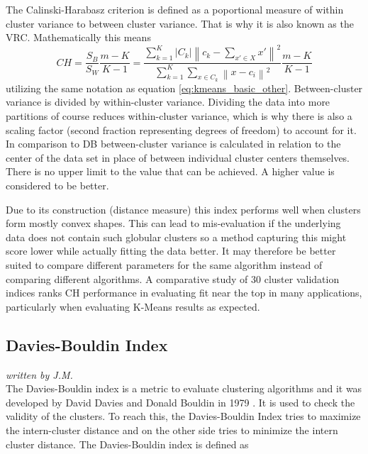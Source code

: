 The Calinski-Harabasz criterion \cite{calinski1974dendrite} is defined as a poportional measure of within cluster variance to between cluster variance. That is why it is also known as the \gls{VRC}. Mathematically this means
\begin{equation}
        CH = \frac{S_{B}}{S_{W}}\frac{m-K}{K-1} = \frac{\sum_{k=1}^{K} \left | C_{k} \right | \left \| c_{k} - \sum_{x' \in X}^{} x' \right \|^{2}}{\sum_{k=1}^{K}\sum_{x \in C_{k}}^{} \left \| x - c_{i} \right \|^{2}} \frac{m-K}{K-1}
\end{equation}
utilizing the same notation as equation \ref{eq:kmeans_basic_other}. Between-cluster variance is divided by within-cluster variance. Dividing the data into more partitions of course reduces within-cluster variance, which is why there is also a scaling factor (second fraction representing degrees of freedom) to account for it. In comparison to \gls{DB} between-cluster variance is calculated in relation to the center of the data set in place of between individual cluster centers themselves. There is no upper limit to the value that can be achieved. A higher value is considered to be better.

Due to its construction (distance measure) this index performs well when clusters form mostly convex shapes. This can lead to mis-evaluation if the underlying data does not contain such globular clusters so a method capturing this might score lower while actually fitting the data better. It may therefore be better suited to compare different parameters for the same algorithm instead of comparing different algorithms. A comparative study of 30 cluster validation indices \cite{arbelaitz2013extensive} ranks \gls{CH} performance in evaluating fit near the top in many applications, particularly when evaluating K-Means results as expected.
    
    
\subsection{Davies-Bouldin Index}
\textit{written by J.M.}\\

The Davies-Bouldin index is a metric to evaluate clustering algorithms and it was developed by David Davies and Donald Bouldin in 1979 \cite{davies1979cluster}. 
It is used to check the validity of the clusters. To reach this, the Davies-Bouldin Index tries to maximize the intern-cluster distance 
and on the other side tries to minimize the intern cluster distance. 
The Davies-Bouldin index is defined as 
	
